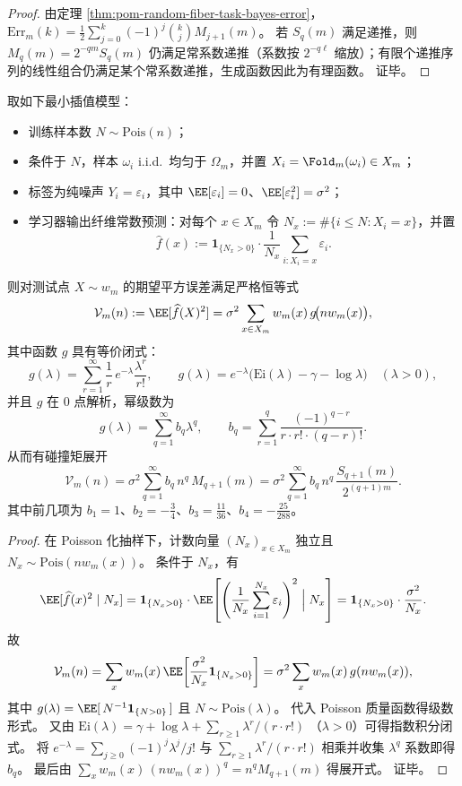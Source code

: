 \begin{proof}
由定理 \ref{thm:pom-random-fiber-task-bayes-error}，
\(
\mathrm{Err}_m(k)=\frac12\sum_{j=0}^k(-1)^j\binom{k}{j}M_{j+1}(m)
\)。
若 \(S_q(m)\) 满足递推，则 \(M_q(m)=2^{-qm}S_q(m)\) 仍满足常系数递推（系数按 \(2^{-q\ell}\) 缩放）；有限个递推序列的线性组合仍满足某个常系数递推，生成函数因此为有理函数。
证毕。
\end{proof}

\begin{proposition}\label{prop:pom-interpolation-variance-poisson-ei-collision}
取如下最小插值模型：
\begin{itemize}
  \item 训练样本数 \(N\sim\mathrm{Pois}(n)\)；
  \item 条件于 \(N\)，样本 \(\omega_i\) i.i.d.\ 均匀于 \(\Omega_m\)，并置 \(X_i=\Fold_m(\omega_i)\in X_m\)；
  \item 标签为纯噪声 \(Y_i=\varepsilon_i\)，其中 \(\EE[\varepsilon_i]=0\)、\(\EE[\varepsilon_i^2]=\sigma^2\)；
  \item 学习器输出纤维常数预测：对每个 \(x\in X_m\) 令 \(N_x:=\#\{i\le N:X_i=x\}\)，并置
  \[
  \widehat f(x):=\mathbf 1_{\{N_x>0\}}\cdot\frac{1}{N_x}\sum_{i:X_i=x}\varepsilon_i.
  \]
\end{itemize}
则对测试点 \(X\sim w_m\) 的期望平方误差满足严格恒等式
\[
\mathcal V_m(n):=\EE[\widehat f(X)^2]
=\sigma^2\sum_{x\in X_m}w_m(x)\,g\!\bigl(nw_m(x)\bigr),
\]
其中函数 \(g\) 具有等价闭式：
\[
g(\lambda)=\sum_{r=1}^{\infty}\frac{1}{r}\,e^{-\lambda}\frac{\lambda^r}{r!},
\qquad
g(\lambda)=e^{-\lambda}\bigl(\mathrm{Ei}(\lambda)-\gamma-\log\lambda\bigr)\quad(\lambda>0),
\]
并且 \(g\) 在 \(0\) 点解析，幂级数为
\[
g(\lambda)=\sum_{q=1}^{\infty}b_q\lambda^q,
\qquad
b_q=\sum_{r=1}^{q}\frac{(-1)^{q-r}}{r\cdot r!\cdot (q-r)!}.
\]
从而有碰撞矩展开
\[
\mathcal V_m(n)=\sigma^2\sum_{q=1}^{\infty}b_q\,n^q\,M_{q+1}(m)
=\sigma^2\sum_{q=1}^{\infty}b_q\,n^q\,\frac{S_{q+1}(m)}{2^{(q+1)m}}.
\]
其中前几项为 \(b_1=1\)、\(b_2=-\tfrac34\)、\(b_3=\tfrac{11}{36}\)、\(b_4=-\tfrac{25}{288}\)。
\end{proposition}

\begin{proof}
在 Poisson 化抽样下，计数向量 \((N_x)_{x\in X_m}\) 独立且 \(N_x\sim\mathrm{Pois}(nw_m(x))\)。
条件于 \(N_x\)，有
\[
\EE[\widehat f(x)^2\mid N_x]
=\mathbf 1_{\{N_x>0\}}\cdot \EE\!\left[\left(\frac{1}{N_x}\sum_{i=1}^{N_x}\varepsilon_i\right)^2\Bigm|N_x\right]
=\mathbf 1_{\{N_x>0\}}\cdot \frac{\sigma^2}{N_x}.
\]
故
\[
\mathcal V_m(n)=\sum_x w_m(x)\,\EE\!\left[\frac{\sigma^2}{N_x}\mathbf 1_{\{N_x>0\}}\right]
=\sigma^2\sum_x w_m(x)\,g(nw_m(x)),
\]
其中 \(g(\lambda)=\EE[\,N^{-1}\mathbf 1_{\{N>0\}}\,]\) 且 \(N\sim\mathrm{Pois}(\lambda)\)。
代入 Poisson 质量函数得级数形式。
又由
\(
\mathrm{Ei}(\lambda)=\gamma+\log\lambda+\sum_{r\ge 1}\lambda^r/(r\cdot r!)
\)
（\(\lambda>0\)）可得指数积分闭式。
将 \(e^{-\lambda}=\sum_{j\ge 0}(-1)^j\lambda^j/j!\) 与 \(\sum_{r\ge 1}\lambda^r/(r\cdot r!)\) 相乘并收集 \(\lambda^q\) 系数即得 \(b_q\)。
最后由 \(\sum_x w_m(x)\,(nw_m(x))^q=n^qM_{q+1}(m)\) 得展开式。
证毕。
\end{proof}

